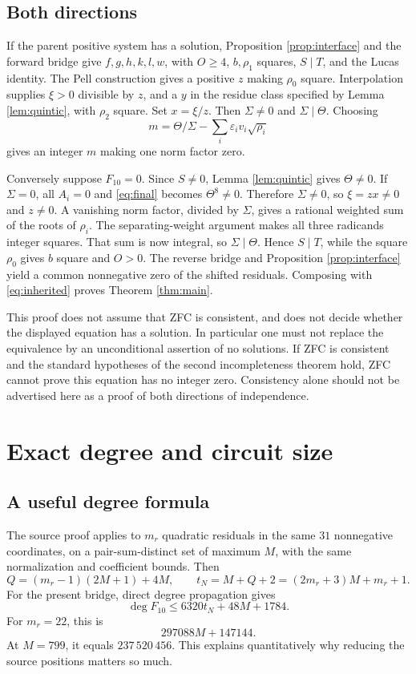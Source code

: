 \documentclass[11pt,a4paper]{article}
\theoremstyle{remark}
\begin{document}
\subsection{Both directions}
If the parent positive system has a solution, Proposition
\ref{prop:interface} and the forward bridge give
\(f,g,h,k,l,w\), with \(O\ge4\), \(b,\rho_1\) squares,
\(S\mid T\), and the Lucas identity. The Pell construction gives
a positive \(z\) making \(\rho_0\) square. Interpolation supplies
\(\xi>0\) divisible by \(z\), and a \(y\) in the residue class
specified by Lemma \ref{lem:quintic}, with \(\rho_2\) square.
Set \(x=\xi/z\). Then \(\Sigma\ne0\) and \(\Sigma\mid\Theta\).
Choosing
\[
m=\Theta/\Sigma-\sum_i\varepsilon_i v_i\sqrt{\rho_i}
\]
gives an integer \(m\) making one norm factor zero.

Conversely suppose \(F_{10}=0\). Since \(S\ne0\), Lemma
\ref{lem:quintic} gives \(\Theta\ne0\).
If \(\Sigma=0\), all \(A_i=0\) and \eqref{eq:final} becomes
\(\Theta^8\ne0\). Therefore \(\Sigma\ne0\), so
\(\xi=zx\ne0\) and \(z\ne0\). A vanishing norm factor, divided
by \(\Sigma\), gives a rational weighted sum of the roots
of \(\rho_i\). The separating-weight argument makes all three
radicands integer squares. That sum is now integral, so
\(\Sigma\mid\Theta\). Hence \(S\mid T\), while the square
\(\rho_0\) gives \(b\) square and \(O>0\).
The reverse bridge and Proposition \ref{prop:interface} yield a
common nonnegative zero of the shifted residuals.
Composing with \eqref{eq:inherited} proves Theorem \ref{thm:main}.

This proof does not assume that ZFC is consistent, and does not
decide whether the displayed equation has a solution. In particular
one must not replace the equivalence by an unconditional assertion
of no solutions. If ZFC is consistent and the standard hypotheses
of the second incompleteness theorem hold, ZFC cannot prove
this equation has no integer zero. Consistency alone should not
be advertised here as a proof of both directions of independence.

\section{Exact degree and circuit size}\label{sec:degree}
\subsection{A useful degree formula}
The source proof applies to \(m_r\) quadratic residuals in the same
\(31\) nonnegative coordinates, on a pair-sum-distinct set of
maximum \(M\), with the same normalization
and coefficient bounds. Then
\[
Q=(m_r-1)(2M+1)+4M,\qquad
t_N=M+Q+2=(2m_r+3)M+m_r+1.
\]
For the present bridge, direct degree propagation gives
\[
\deg F_{10}\le6320t_N+48M+1784.
\]
For \(m_r=22\), this is
\[
297088M+147144.
\]
At \(M=799\), it equals \(237\,520\,456\).
This explains quantitatively why reducing the source positions
matters so much.
\end{document}
